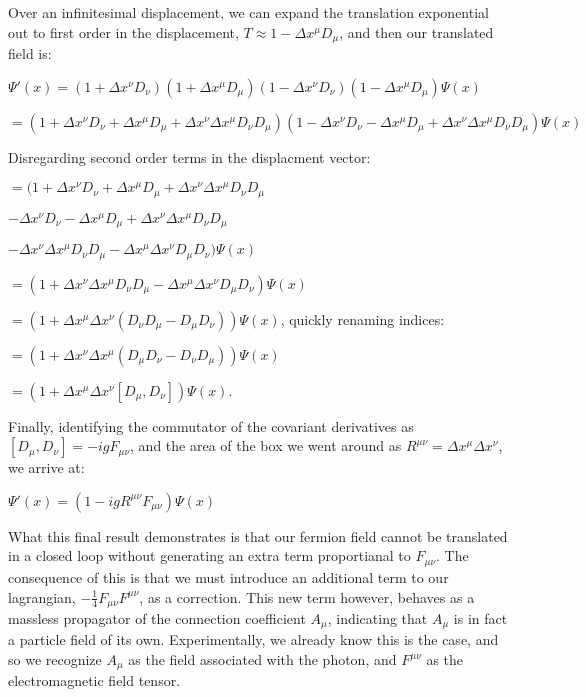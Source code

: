 \documentclass{article}
\begin{document}
        
        Over an infinitesimal displacement, we can expand the translation exponential out to first order in the displacement,
        $ T \approx 1 - \Delta x^\mu D_\mu $, and then our translated field is:


        $ \Psi'(x) = (1 + \Delta x^\nu D_\nu)(1 + \Delta x^\mu D_\mu)(1 - \Delta x^\nu D_\nu)(1 - \Delta x^\mu D_\mu) \Psi(x) $

        $ = (1 + \Delta x^\nu D_\nu + \Delta x^\mu D_\mu + \Delta x^\nu \Delta x^\mu D_\nu D_\mu)
        (1 - \Delta x^\nu D_\nu - \Delta x^\mu D_\mu + \Delta x^\nu \Delta x^\mu D_\nu D_\mu) \Psi(x) $

        \vspace{5pt}

        Disregarding second order terms in the displacment vector:

                $ = (1 + \Delta x^\nu D_\nu + \Delta x^\mu D_\mu + \Delta x^\nu \Delta x^\mu D_\nu D_\mu $

        \hspace{20pt}$ - \Delta x^\nu D_\nu - \Delta x^\mu D_\mu + \Delta x^\nu \Delta x^\mu D_\nu D_\mu $

        \hspace{20pt}$ - \Delta x^\nu \Delta x^\mu D_\nu D_\mu - \Delta x^\mu \Delta x^\nu D_\mu D_\nu) \Psi(x) $

        \vspace{5pt}

        $ = (1 + \Delta x^\nu \Delta x^\mu D_\nu D_\mu - \Delta x^\mu \Delta x^\nu D_\mu D_\nu) \Psi(x)$

        $ = \left(1 + \Delta x^\mu \Delta x^\nu ( D_\nu D_\mu - D_\mu D_\nu) \right) \Psi(x)$, quickly renaming indices:

        $ = \left(1 + \Delta x^\nu \Delta x^\mu ( D_\mu D_\nu - D_\nu D_\mu) \right) \Psi(x)$

        $ = \left(1 + \Delta x^\mu \Delta x^\nu [ D_\mu , D_\nu ] \right) \Psi(x)$.

        \vspace{5pt}
        Finally, identifying the commutator of the covariant derivatives as
        $ [ D_\mu , D_\nu ] = - i g F_{\mu \nu} $, and the area of the box we went around as
        $ R^{\mu \nu} = \Delta x^\mu \Delta x^\nu $, we arrive at:

        $ \Psi'(x) = \left(1 -i g R^{\mu \nu} F_{\mu \nu} \right) \Psi(x)$

        What this final result demonstrates is that our fermion field cannot be translated in a closed loop without generating an extra term proportianal to $F_{\mu \nu}$. The consequence of this is that we must introduce an additional term to our lagrangian,
        $-\frac{1}{4}F_{\mu \nu} F^{\mu \nu}$, as a correction. This new term however, behaves as a massless propagator of the connection coefficient $A_\mu$, indicating that $A_\mu$ is in fact a particle field of its own. Experimentally, we already know this is the case, and so we recognize $A_\mu$ as the field associated with the photon, and $F^{\mu \nu}$ as the electromagnetic field tensor.
\end{document}
